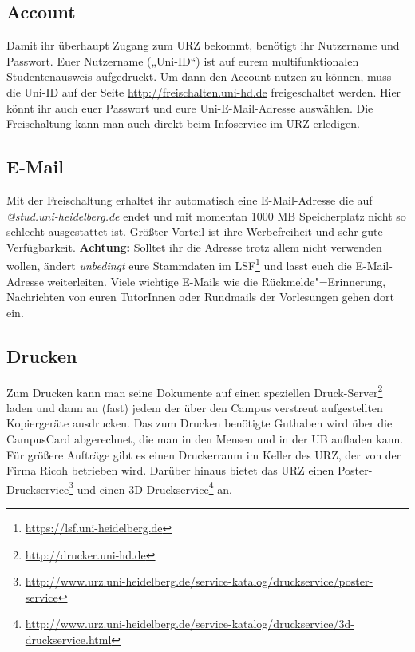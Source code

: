 \subsection*{Account}
Damit ihr überhaupt Zugang zum URZ bekommt, benötigt ihr Nutzername und Passwort. Euer Nutzername („Uni-ID“) ist auf eurem multifunktionalen Studentenausweis aufgedruckt. Um dann den Account nutzen zu können, muss die Uni-ID auf der Seite \url{http://freischalten.uni-hd.de} freigeschaltet werden. Hier könnt ihr auch euer Passwort und eure Uni-E-Mail-Adresse auswählen. Die Freischaltung kann man auch direkt beim Infoservice im URZ erledigen.

\subsection*{E-Mail}
Mit der Freischaltung erhaltet ihr automatisch eine E-Mail-Adresse die auf \emph{@stud.uni-heidelberg.de} endet und mit momentan 1000 MB Speicherplatz nicht so schlecht ausgestattet ist. Größter Vorteil ist ihre Werbefreiheit und sehr gute Verfügbarkeit. \textbf{Achtung:} Solltet ihr die Adresse trotz allem nicht verwenden wollen, ändert \emph{unbedingt} eure Stammdaten im LSF\footnote{\url{https://lsf.uni-heidelberg.de}} und lasst euch die E-Mail-Adresse weiterleiten. Viele wichtige E-Mails wie die Rückmelde"=Erinnerung, Nachrichten von euren TutorInnen oder Rundmails der Vorlesungen gehen dort ein.


\subsection*{Drucken}

Zum Drucken kann man seine Dokumente auf einen speziellen Druck-Server\footnote{\url{http://drucker.uni-hd.de}} laden und dann an (fast) jedem der über den Campus verstreut aufgestellten Kopiergeräte ausdrucken. Das zum Drucken benötigte Gut\-ha\-ben wird über die CampusCard abgerechnet, die man in den Mensen und in der \gls{UB} aufladen kann. Für größere Aufträge gibt es einen Druckerraum im Keller des \gls{URZ}, der von der Firma Ricoh betrieben wird. Darüber hinaus bietet das URZ einen Poster-Druckservice\footnote{\url{http://www.urz.uni-heidelberg.de/service-katalog/druckservice/poster-service}} und einen 3D-Druckservice\footnote{\url{http://www.urz.uni-heidelberg.de/service-katalog/druckservice/3d-druckservice.html}} an.

